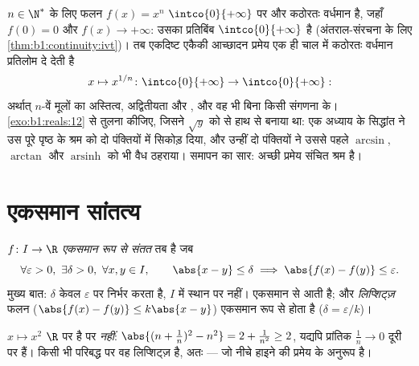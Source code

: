 \begin{example}[सभी कोटियों के मूल]\label{ex:b1:continuity:nthroot}
$n \in \N^*$ के लिए फलन $f(x) = x^n$ $\intco{0}{+\infty}$ पर  और कठोरतः
वर्धमान है, जहाँ $f(0) = 0$ और $f(x) \to +\infty$: उसका प्रतिबिंब
$\intco{0}{+\infty}$ है (अंतराल-संरचना के लिए \cref{thm:b1:continuity:ivt})।
तब एकदिष्ट एकैकी आच्छादन प्रमेय एक ही चाल में कठोरतः वर्धमान \emph{}
प्रतिलोम दे देती है
\[
x \mapsto x^{1/n} \colon \intco{0}{+\infty} \to
\intco{0}{+\infty} :
\]
अर्थात् $n$-वें मूलों का अस्तित्व, अद्वितीयता और , और वह भी बिना किसी
संगणना के। \cref{exo:b1:reals:12} से तुलना कीजिए, जिसने $\sqrt y$ को 
से हाथ से बनाया था: एक अध्याय के सिद्धांत ने उस पूरे पृष्ठ के श्रम को दो
पंक्तियों में सिकोड़ दिया, और उन्हीं दो पंक्तियों ने उससे पहले $\arcsin$,
$\arctan$ और $\operatorname{arsinh}$ को भी वैध ठहराया। समापन का सार: अच्छी
प्रमेय संचित श्रम है।
\end{example}

\section{एकसमान सांतत्य}

\begin{definition}\label{def:b1:continuity:uniform}
$f \colon I \to \R$ \emph{एकसमान रूप से संतत} तब है जब
\[
\forall \varepsilon > 0,\ \exists \delta > 0,\ \forall x, y \in I,
\qquad \abs{x - y} \leq \delta \implies \abs{f(x) - f(y)} \leq
\varepsilon .
\]
मुख्य बात: $\delta$ केवल $\varepsilon$ पर निर्भर करता है, $I$ में स्थान पर
नहीं। एकसमान  से  आती है; और \emph{लिप्शिट्ज़} फलन ($\abs{f(x)
- f(y)} \leq k \abs{x - y}$) एकसमान रूप से  होता है ($\delta =
\varepsilon/k$)।
\end{definition}

\begin{example}\label{ex:b1:continuity:notuniform}
$x \mapsto x^2$ $\R$ पर  है पर  \emph{नहीं}: $\abs{(n
+ \frac 1n)^2 - n^2} = 2 + \frac{1}{n^2} \geq 2$, यद्यपि प्रांतिक $\frac 1n
\to 0$ दूरी पर हैं। किसी भी परिबद्ध  पर वह लिप्शिट्ज़ है, अतः  --- जो नीचे हाइने की प्रमेय के अनुरूप है।
\end{example}

